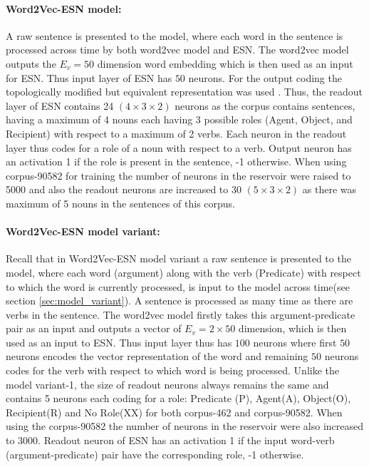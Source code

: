 \paragraph{Word2Vec-ESN model:} A raw sentence is presented to the model, where each word in the sentence is processed across time by both word2vec model and ESN. The word2vec model outputs the $E_{v} = 50$ dimension word embedding which is then used as an input for ESN. Thus input layer of ESN has $50$ neurons. For the output coding the topologically modified but equivalent representation was used \cite{xavier:2013:RT}. Thus, the readout layer of ESN contains 24 $(4 \times 3 \times 2)$ neurons as the corpus contains sentences, having a maximum of 4 nouns each having 3 possible roles (Agent, Object, and Recipient) with respect to a maximum of 2 verbs. Each neuron in the readout layer thus codes for a role of a noun with respect to a verb. Output neuron has an activation 1 if the role is present in the sentence, -1 otherwise. When using corpus-90582 for training the number of neurons in the reservoir were raised to 5000 and also the  readout neurons are increased to 30 $(5 \times 3 \times 2)$ as there was maximum of 5 nouns in the sentences of this corpus.

\paragraph{Word2Vec-ESN model variant:} Recall that in Word2Vec-ESN model variant a raw sentence is presented to the model, where each word (argument) along with the verb (Predicate) with respect to which the word is currently processed, is input to the model across time(see section \ref{sec:model_variant}). A sentence is processed as many time as there are verbs in the sentence. The word2vec model firstly takes this argument-predicate pair as an input and outputs a vector of $E_{v} = 2 \times 50$ dimension, which is then used as an input to ESN. Thus input layer thus has $100$ neurons where first $50$ neurons encodes the vector representation of the word and remaining $50$ neurons codes for the verb with respect to which word is being processed. Unlike the model variant-1, the size of readout neurons always remains the same and contains 5 neurons each coding for a role: Predicate (P), Agent(A), Object(O), Recipient(R) and No Role(XX) for both corpus-462 and corpus-90582. When using the corpus-90582 the number of neurons in the reservoir were also increased to 3000. Readout neuron of ESN has an activation 1 if the input word-verb (argument-predicate) pair have the corresponding role, -1 otherwise. 

